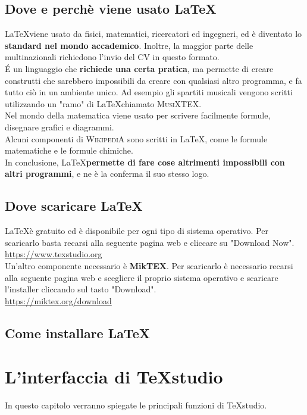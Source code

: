 \documentclass[12pt, oneside, openany, a4paper]{book}
\begin{document}
		\section{Dove e perchè viene usato \LaTeX}
		\LaTeX\space viene usato da fisici, matematici, ricercatori ed ingegneri, ed è diventato lo \textbf{standard nel mondo accademico}. Inoltre, la maggior parte delle multinazionali richiedono l'invio del CV in questo formato.
		\\É un linguaggio che \textbf{richiede una certa pratica}, ma permette di creare construtti che sarebbero impossibili da creare con qualsiasi altro programma, e fa tutto ciò in un ambiente unico. Ad esempio gli spartiti musicali vengono scritti utilizzando un "ramo" di \LaTeX\space chiamato \textsc{MusiXTEX}.
		\\Nel mondo della matematica viene usato per scrivere facilmente formule, disegnare grafici e diagrammi.
		\\Alcuni componenti di \textsc{WikipediA} sono scritti in \LaTeX\space, come le formule matematiche e le formule chimiche.
		\\In conclusione, \LaTeX\space \textbf{permette di fare cose altrimenti impossibili con altri programmi}, e ne è la conferma il suo stesso logo. 
	
		\section{Dove scaricare \LaTeX}
		\LaTeX\space è gratuito ed è disponibile per ogni tipo di sistema operativo. Per scaricarlo basta recarsi alla seguente pagina web e cliccare su "Download Now".
		\\ \url{https://www.texstudio.org}\\
		Un'altro componente necessario è \textbf{MikTEX}. Per scaricarlo è necessario recarsi alla seguente pagina web e scegliere il proprio sistema operativo e scaricare l'installer cliccando sul tasto "Download".
		\\ \url{https://miktex.org/download}\\
	
		\section{Come installare \LaTeX}
	
	
	\chapter{L'interfaccia di TeXstudio}
	In questo capitolo verranno spiegate le principali funzioni di TeXstudio.
\end{document}
